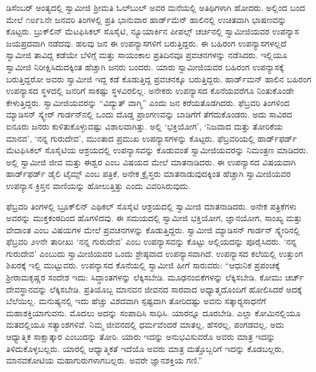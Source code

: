  ಡಿಸೆಂಬರ್ ಅಂತ್ಯದಲ್ಲಿ ಸ್ವಾಮೀಜಿ ಶ‍್ರೀಮತಿ ಓಲ್‍ಬುಲ್ ಅವರ ಮನೆಯಲ್ಲಿ ಅತಿಥಿಗಳಾಗಿ ಹೋದರು. ಅಲ್ಲಿಂದ ಬಂದ ಮೇಲೆ ೧೮೯೩ನೇ ಜನವರಿ ತಿಂಗಳಲ್ಲಿ ಪ್ರತಿ ಭಾನುವಾರ ಹಾರ್ಡ್‍ಮೆನ್ ಹಾಲಿನಲ್ಲಿ ಉಚಿತವಾಗಿ ಭಾಷಣವನ್ನು ಕೊಟ್ಟರು. ಬ್ರುಕ್‍ಲಿನ್ ಮೆಟಫಿಸಿಕಲ್ ಸೊಸೈಟಿ, ನ್ಯೂಯಾರ್ಕಿನ ಪೀಪಲ್ಸ್ ಚರ್ಚಿನಲ್ಲಿ ಸ್ವಾಮೀಜಿಯವರ ಉಪನ್ಯಾಸ ಜಯಪ್ರದವಾಗಿ ನಡೆದವು. ಹಲವು ಜನ ಈ ಉಪನ್ಯಾಸಗಳಿಗೆ ಬರುತ್ತಿದ್ದರು. ಈ ಬಹಿರಂಗ ಉಪನ್ಯಾಸಗಳಲ್ಲದೆ ಸ್ವಾಮೀಜಿ ತಾವಿದ್ದ ಕಡೆಯೇ ಬೆಳಿಗ್ಗೆ ಮತ್ತು ಸಾಯಂಕಾಲ ಪ್ರತಿದಿನವೂ ಪ್ರವಚನಗಳನ್ನು ನಡೆಸಿದರು. ಇಲ್ಲಿಯೂ ಸ್ವಾಮೀಜಿ ನಿರೀಕ್ಷಿಸಿದುದಕ್ಕಿಂತ ಹೆಚ್ಚಾಗಿ ಜನರು ಬಂದರು. ಯಾರು ಸ್ವಾಮೀಜಿಯವರ ಬಹಿರಂಗ ಉಪನ್ಯಾಸಕ್ಕೆ ಬರುತ್ತಿದ್ದರೋ ಅವರು ಸ್ವಾಮೀಜಿ ಇದ್ದ ಕಡೆ ಕೊಡುತ್ತಿದ್ದ ಪ್ರವಚನಕ್ಕೂ ಬರುತ್ತಿದ್ದರು. ಹಾರ್ಡ್‍ಮನ್ ಹಾಲಿನ ಬಹಿರಂಗ ಉಪನ್ಯಾಸದ ಸ್ಥಳದಲ್ಲಿ ಜನರಿಗೆ ಸಾಕಷ್ಟು ಸ್ಥಳವಿರಲಿಲ್ಲ. ಅನೇಕರು ಉಪನ್ಯಾಸದ ಕೊನೆಯವರೆಗೂ ನಿಂತುಕೊಂಡೇ ಕೇಳುತ್ತಿದ್ದರು. ಸ್ವಾಮೀಜಿಯವರನ್ನು “ವಿದ್ಯುತ್ ವಾಗ್ಮಿ” ಎಂದು ಜನ ಕರೆಯತೊಡಗಿದರು. ಫೆಬ್ರವರಿ ತಿಂಗಳಿಂದ ಮ್ಯಾಡಿಸನ್ ಸ್ಕ್ವೇರ್ ಗಾರ್ಡನ್‍ನಲ್ಲಿ ಒಂದು ದೊಡ್ಡ ಪ್ರಾಂಗಣವನ್ನು ಬಾಡಿಗೆಗೆ ತೆಗೆದುಕೊಂಡರು. ಅದು ಸಾವಿರದ ಐನೂರು ಜನರು ಕುಳಿತುಕೊಳ್ಳುವಷ್ಟು ವಿಶಾಲವಾಗಿತ್ತು. ಅಲ್ಲಿ ‘ಭಕ್ತಿಯೋಗ’, ‘ನಿಜವಾದ ಮತ್ತು ತೋರಿಕೆಯ ಮಾನವ’, ‘ನನ್ನ ಗುರುದೇವ’, ಮುಂತಾದ ಪ್ರಮುಖ ಉಪನ್ಯಾಸಗಳನ್ನು ಕೊಟ್ಟರು. ಫೆಬ್ರವರಿಯಲ್ಲಿ ಹಾರ್ಡ್‍ಫರ್ಡ್ ಮೆಟಫಿಸಿಕಲ್ ಸೊಸೈಟಿಯ ಆಶ್ರಯದಲ್ಲಿ ಉಪನ್ಯಾಸವನ್ನು ಕೊಡುವಂತೆ ಸ್ವಾಮೀಜಿಯವರನ್ನು ನಿಮಂತ್ರಣ ಮಾಡಿದರು. ಅಲ್ಲಿ ಸ್ವಾಮೀಜಿ ಜೀವ ಮತ್ತು ಈಶ್ವರ ಎಂಬ ವಿಷಯದ ಮೇಲೆ ಮಾತನಾಡಿದರು. ಈ ಉಪನ್ಯಾಸದ ವಿಷಯವಾಗಿ ಹಾರ್ಡ್‍ಫರ್ಡ್ ಡೈಲಿ ಟೈಮ್ಸ್ ಎಂಬ ಪತ್ರಿಕೆ, ಅನೇಕ ಕ್ರೈಸ್ತರು ಮಾತನಾಡುವುದಕ್ಕಿಂತ ಹೆಚ್ಚಾಗಿ ಸ್ವಾಮೀಜಿಯವರ ಉಪನ್ಯಾಸ ಕ್ರಿಸ್ತನ ವಾಣಿಯನ್ನು ಹೋಲುತ್ತಿತ್ತು ಎಂದು ವಿವರಿಸಿರುವುದು. 

 ಫೆಬ್ರವರಿ ತಿಂಗಳಲ್ಲಿ ಬ್ರೂಕ್‍ಲಿನ್ ಎಥಿಕಲ್ ಸೊಸೈಟಿ ಆಶ್ರಯದಲ್ಲಿ ಸ್ವಾಮೀಜಿ ಮಾತನಾಡಿದರು. ಅನೇಕ ಪತ್ರಿಕೆಗಳು ಅವರನ್ನು ಮುಕ್ತಕಂಠದಿಂದ ಹೊಗಳಿದವು. ಈ ಸಮಯದಲ್ಲಿ ಸ್ವಾಮೀಜಿ ಭಕ್ತಿಯೋಗ, ಜ್ಞಾನಯೋಗ, ಸಾಂಖ್ಯ ಮತ್ತು ವೇದಾಂತ ಎಂಬ ವಿಷಯಗಳ ಮೇಲೆ ಪ್ರವಚನಗಳನ್ನು ಕೊಡುತ್ತಿದ್ದರು. ಸ್ವಾಮೀಜಿ ಮ್ಯಾಡಿಸನ್ ಗಾರ್ಡನ್ ಸ್ಕ್ವೇರಿನಲ್ಲಿ ಫೆಬ್ರವರಿ ೨೪ನೇ ತಾರೀಖು ‘ನನ್ನ ಗುರುದೇವ’ ಎಂಬ ಉಪನ್ಯಾಸವನ್ನು ಕೊಟ್ಟು ಅಲ್ಲಿಯದನ್ನು ಪೂರೈಸಿದರು. ‘ನನ್ನ ಗುರುದೇವ’ ಎಂಬುದು ಸ್ವಾಮೀಜಿಯವರ ಒಂದು ಶ್ರೇಷ್ಠವಾದ ಉಪನ್ಯಾಸವಾಗಿದೆ. ಉಪನ್ಯಾಸದ ಕಲೆಯಲ್ಲಿ ಉತ್ತುಂಗ ಶಿಖರಕ್ಕೆ ಇಲ್ಲಿ ಮುಟ್ಟುವರು. ಉಪನ್ಯಾಸದ ಕೊನೆಯಲ್ಲಿ ಸ್ವಾಮೀಜಿ ಹೀಗೆ ಸಾರುವರು: “ಆಧುನಿಕ ಪ್ರಪಂಚಕ್ಕೆ ಶ‍್ರೀರಾಮಕೃಷ್ಣರ ಸಂದೇಶ ಇದು: ಸಿದ್ಧಾಂತಗಳನ್ನು ಲೆಕ್ಕಿಸಬೇಡಿ. ಮೂಢನಂಬಿಕೆಗಳನ್ನು ಲೆಕ್ಕಿಸಬೇಡಿ. ಕೋಮು ಚರ್ಚ್ ದೇವಸ್ಥಾನವನ್ನು ಲೆಕ್ಕಿಸಬೇಡಿ. ಪ್ರತಿಯೊಬ್ಬ ಮಾನವನ ಜೀವನದ ಸಾರವಾದ ಅಧ್ಯಾತ್ಮದೊಂದಿಗೆ ಹೋಲಿಸಿದರೆ ಅದಕ್ಕೆ ಬೆಲೆಯಿಲ್ಲ. ಮನುಷ್ಯನಲ್ಲಿ ಇದು ಹೆಚ್ಚು ವಿಶದವಾಗಿ ಸ್ಪಷ್ಟವಾಗಿ ತೋರಿದಷ್ಟು ಅವನು ಸತ್ಕಾರ‍್ಯಸಾಧನೆಗೆ ಮಹಾಶಕ್ತಿಯಾಗುವನು. ಮೊದಲು ಅದನ್ನು ಸಂಪಾದಿಸಿ ಸಾಧಿಸಿ. ಯಾರನ್ನೂ ದೂರಬೇಡಿ. ಎಲ್ಲಾ ಕೋಮಿನಲ್ಲಿಯೂ ಮತದಲ್ಲಿಯೂ ಸತ್ಯಾಂಶಗಳಿವೆ. ನಿಮ್ಮ ಜೀವನದಲ್ಲಿ ಧರ್ಮವೆಂದರೆ ಮಾತಲ್ಲ, ಹೆಸರಲ್ಲ, ಪಂಗಡವಲ್ಲ, ಅದು ಆಧ್ಯಾತ್ಮಿಕ ಸಾಕ್ಷಾತ್ಕಾರ ಎಂಬುದನ್ನು ತೋರಿ. ಯಾರು ಇದನ್ನು ಅನುಭವಿಸುವರೊ ಅವರು ಮಾತ್ರ ಇದನ್ನು ತಿಳಿದುಕೊಳ್ಳಬಲ್ಲರು. ಯಾರಲ್ಲಿ ಆಧ್ಯಾತ್ಮಿಕತೆ ಇದೆಯೊ ಅವರು ಮಾತ್ರ ಮತ್ತೊಬ್ಬರಿಗೆ ಇದನ್ನು ಕೊಡಬಲ್ಲರು, ಮಾನವಕೋಟಿಯ ಮಹಾಗುರುಗಳಾಗಬಲ್ಲರು. ಅವರೇ ಜ್ಞಾನಶಕ್ತಿಯ ಗಣಿ.” 


